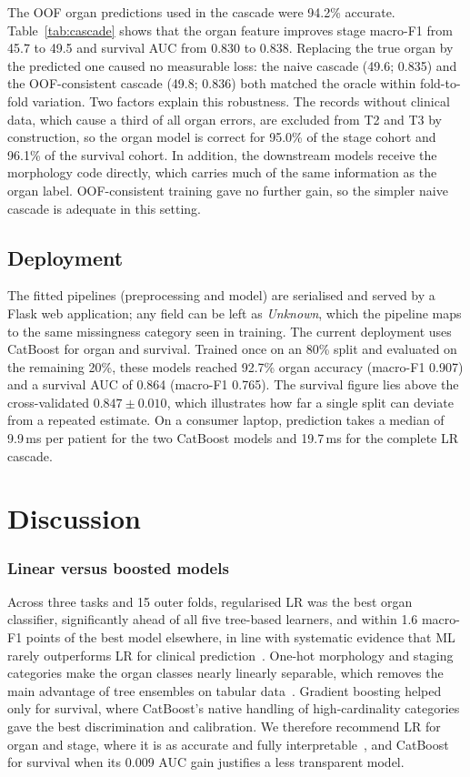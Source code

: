 \documentclass[conference]{IEEEtran}
\begin{document}
The OOF organ predictions used in the cascade were 94.2\% accurate. Table~\ref{tab:cascade} shows that the organ feature improves stage macro-F1 from 45.7 to 49.5 and survival AUC from 0.830 to 0.838. Replacing the true organ by the predicted one caused no measurable loss: the naive cascade (49.6; 0.835) and the OOF-consistent cascade (49.8; 0.836) both matched the oracle within fold-to-fold variation. Two factors explain this robustness. The records without clinical data, which cause a third of all organ errors, are excluded from T2 and T3 by construction, so the organ model is correct for 95.0\% of the stage cohort and 96.1\% of the survival cohort. In addition, the downstream models receive the morphology code directly, which carries much of the same information as the organ label. OOF-consistent training gave no further gain, so the simpler naive cascade is adequate in this setting.

\subsection{Deployment}
The fitted pipelines (preprocessing and model) are serialised and served by a Flask web application; any field can be left as \emph{Unknown}, which the pipeline maps to the same missingness category seen in training. The current deployment uses CatBoost for organ and survival. Trained once on an 80\% split and evaluated on the remaining 20\%, these models reached 92.7\% organ accuracy (macro-F1 0.907) and a survival AUC of 0.864 (macro-F1 0.765). The survival figure lies above the cross-validated $0.847\pm0.010$, which illustrates how far a single split can deviate from a repeated estimate. On a consumer laptop, prediction takes a median of 9.9\,ms per patient for the two CatBoost models and 19.7\,ms for the complete LR cascade.

\section{Discussion}
\subsubsection*{Linear versus boosted models}
Across three tasks and 15 outer folds, regularised LR was the best organ classifier, significantly ahead of all five tree-based learners, and within 1.6 macro-F1 points of the best model elsewhere, in line with systematic evidence that ML rarely outperforms LR for clinical prediction~\cite{christodoulou2019}. One-hot morphology and staging categories make the organ classes nearly linearly separable, which removes the main advantage of tree ensembles on tabular data~\cite{grinsztajn2022}. Gradient boosting helped only for survival, where CatBoost's native handling of high-cardinality categories gave the best discrimination and calibration. We therefore recommend LR for organ and stage, where it is as accurate and fully interpretable~\cite{rudin2019}, and CatBoost for survival when its 0.009 AUC gain justifies a less transparent model.
\end{document}
